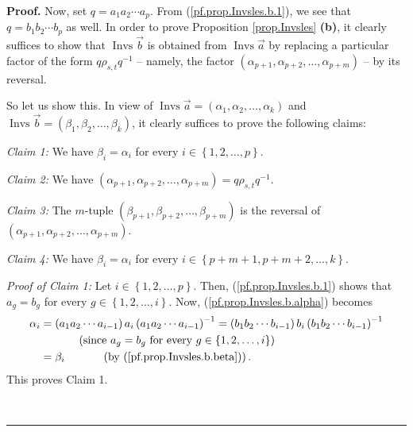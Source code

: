 \documentclass[numbers=enddot,12pt,final,onecolumn,notitlepage,abstracton]{scrartcl}%
\theoremstyle{definition}
\newenvironment{proof}[1][Proof]{\noindent\textbf{#1.} }{\ \rule{0.5em}{0.5em}}
\begin{document}
\begin{proof}
Now, set $q=a_{1}a_{2}\cdots a_{p}$. From (\ref{pf.prop.Invsles.b.1}), we see
that $q=b_{1}b_{2}\cdots b_{p}$ as well. In order to prove Proposition
\ref{prop.Invsles} \textbf{(b)}, it clearly suffices to show that
$\operatorname*{Invs}\overrightarrow{b}$ is obtained from
$\operatorname*{Invs}\overrightarrow{a}$ by replacing a particular factor of
the form $q\rho_{s,t}q^{-1}$ -- namely, the factor $\left(  \alpha
_{p+1},\alpha_{p+2},\ldots,\alpha_{p+m}\right)  $ -- by its reversal.

So let us show this. In view of $\operatorname*{Invs}\overrightarrow{a}%
=\left(  \alpha_{1},\alpha_{2},\ldots,\alpha_{k}\right)  $ and
$\operatorname*{Invs}\overrightarrow{b}=\left(  \beta_{1},\beta_{2}%
,\ldots,\beta_{k}\right)  $, it clearly suffices to prove the following claims:

\textit{Claim 1:} We have $\beta_{i}=\alpha_{i}$ for every $i\in\left\{
1,2,\ldots,p\right\}  $.

\textit{Claim 2:} We have $\left(  \alpha_{p+1},\alpha_{p+2},\ldots
,\alpha_{p+m}\right)  =q\rho_{s,t}q^{-1}$.

\textit{Claim 3:} The $m$-tuple $\left(  \beta_{p+1},\beta_{p+2},\ldots
,\beta_{p+m}\right)  $ is the reversal of $\left(  \alpha_{p+1},\alpha
_{p+2},\ldots,\alpha_{p+m}\right)  $.

\textit{Claim 4:} We have $\beta_{i}=\alpha_{i}$ for every $i\in\left\{
p+m+1,p+m+2,\ldots,k\right\}  $.

\textit{Proof of Claim 1:} Let $i\in\left\{  1,2,\ldots,p\right\}  $. Then,
(\ref{pf.prop.Invsles.b.1}) shows that $a_{g}=b_{g}$ for every $g\in\left\{
1,2,\ldots,i\right\}  $. Now, (\ref{pf.prop.Invsles.b.alpha}) becomes%
\begin{align*}
\alpha_{i}  &  =\left(  a_{1}a_{2}\cdots a_{i-1}\right)  a_{i}\left(
a_{1}a_{2}\cdots a_{i-1}\right)  ^{-1}=\left(  b_{1}b_{2}\cdots b_{i-1}%
\right)  b_{i}\left(  b_{1}b_{2}\cdots b_{i-1}\right)  ^{-1}\\
&  \ \ \ \ \ \ \ \ \ \ \left(  \text{since }a_{g}=b_{g}\text{ for every }%
g\in\left\{  1,2,\ldots,i\right\}  \right) \\
&  =\beta_{i}\ \ \ \ \ \ \ \ \ \ \left(  \text{by
(\ref{pf.prop.Invsles.b.beta})}\right)  .
\end{align*}
This proves Claim 1.


\end{proof}
\end{document}
